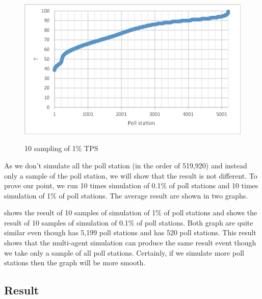 \documentclass[JIP]{ipsj}
\begin{document}
\begin{figure}[tb]%
\vbox{\it
  \hbox{\includegraphics[scale=0.6]{images/graph-sampling1k.eps}}}
\centerline{}
\caption{10 sampling of 1\% TPS}
\label{fig:sampling1k}
\end{figure}


As we don't simulate all the poll station (in the order of 519,920) and instead only a sample of the poll station, we will show that the result is not different. To prove our point, we run 10 times simulation of 0.1\% of poll stations and 10 times simulation of 1\% of poll stations. The average result are shown in two graphs.

 shows the result of 10 samples of simulation of 1\% of poll stations and  shows the result of 10 samples of simulation of 0.1\% of poll stations. Both graph are quite similar even though  has 5,199 poll stations and  has 520 poll stations. This result shows that the multi-agent simulation can produce the same result event though we take only a sample of all poll stations. Certainly, if we simulate more poll stations then the graph will be more smooth.


\subsection{Result}%
\end{document}
